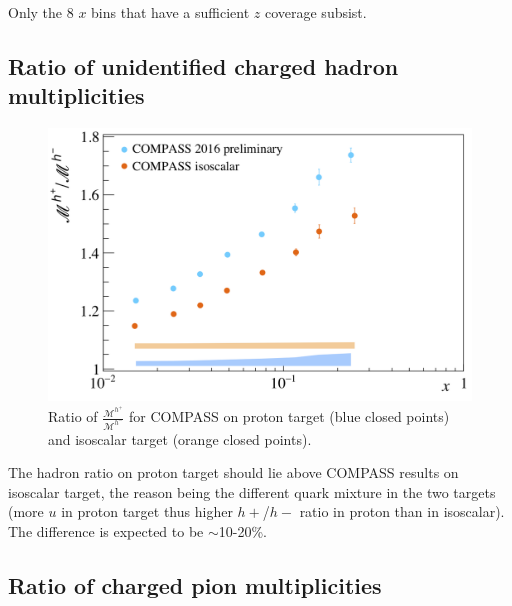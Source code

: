 Only the 8 $x$ bins that have a sufficient $z$ coverage subsist.

\subsection{Ratio of unidentified charged hadron multiplicities}

\begin{figure}[!h]
  \centering
	\includegraphics[scale=0.5]{./gfx/hr.png}
	\caption{Ratio of $\frac{\mathscr{M}^{h^+}}{\mathscr{M}^{h^-}}$ for COMPASS on proton target (blue closed points) and isoscalar target (orange closed points).}
	\label{pic:hratio}
\end{figure}

The hadron ratio on proton target should lie above COMPASS results on isoscalar target, the reason being the different quark mixture in the two targets (more $u$ in proton target thus higher $h+$/$h-$ ratio in proton than in isoscalar). The difference is expected to be $\sim$10-20\%.

\newpage

\subsection{Ratio of charged pion multiplicities}

